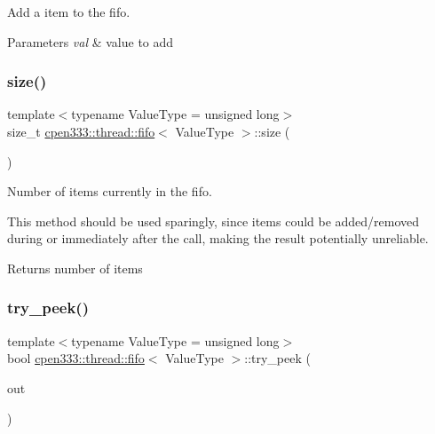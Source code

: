 Add a item to the fifo. 


\begin{DoxyParams}{Parameters}
{\em val} & value to add \\
\hline
\end{DoxyParams}
\mbox{\label{classcpen333_1_1thread_1_1fifo_a9cb822d2b108ebf092146dbe2cd90f1f}} 
\subsubsection{\texorpdfstring{size()}{size()}}
{\footnotesize\ttfamily template$<$typename Value\+Type  = unsigned long$>$ \\
size\+\_\+t \hyperlink{classcpen333_1_1thread_1_1fifo}{cpen333\+::thread\+::fifo}$<$ Value\+Type $>$\+::size (\begin{DoxyParamCaption}{ }\end{DoxyParamCaption})\hspace{0.3cm}{\ttfamily [inline]}}



Number of items currently in the fifo. 

This method should be used sparingly, since items could be added/removed during or immediately after the call, making the result potentially unreliable.

\begin{DoxyReturn}{Returns}
number of items 
\end{DoxyReturn}
\mbox{\label{classcpen333_1_1thread_1_1fifo_a0a87d4e6696311526278db72bbfc91c1}} 
\subsubsection{\texorpdfstring{try\+\_\+peek()}{try\_peek()}}
{\footnotesize\ttfamily template$<$typename Value\+Type  = unsigned long$>$ \\
bool \hyperlink{classcpen333_1_1thread_1_1fifo}{cpen333\+::thread\+::fifo}$<$ Value\+Type $>$\+::try\+\_\+peek (\begin{DoxyParamCaption}\item[{Value\+Type $\ast$}]{out }\end{DoxyParamCaption})\hspace{0.3cm}{\ttfamily [inline]}}



